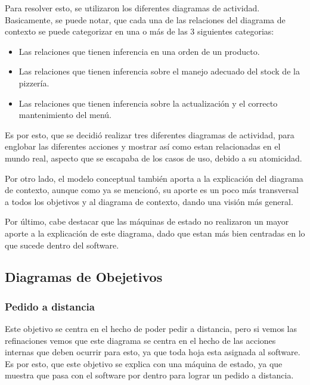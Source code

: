 \documentclass[a4paper,10pt]{article}
\begin{document}
Para resolver esto, se utilizaron los diferentes diagramas de actividad. Basicamente, se puede notar, que cada una de las relaciones del diagrama de
contexto se puede categorizar en una o m\'as de las 3 siguientes categorias:
\begin{itemize}
\item Las relaciones que tienen inferencia en una orden de un producto.
\item Las relaciones que tienen inferencia sobre el manejo adecuado del stock de la pizzer\'ia.
\item Las relaciones que tienen inferencia sobre la actualizaci\'on y el correcto mantenimiento del men\'u.
\end{itemize}

Es por esto, que se decidi\'o realizar tres diferentes diagramas de actividad, para englobar las diferentes acciones y mostrar as\'i como 
estan relacionadas en el mundo real, aspecto que se escapaba de los casos de uso, debido a su atomicidad.



Por otro lado, el modelo conceptual tambi\'en aporta a la explicaci\'on del diagrama de contexto, aunque como ya se mencion\'o, su aporte
es un poco m\'as transversal a todos los objetivos y al diagrama de contexto, dando una visi\'on m\'as general.


Por \'ultimo, cabe destacar que las m\'aquinas de estado no realizaron un mayor aporte a la explicaci\'on de este diagrama, dado que estan m\'as bien
centradas en lo que sucede dentro del software.

\subsection*{Diagramas de Obejetivos}

\subsubsection*{Pedido a distancia}

Este objetivo se centra en el hecho de poder pedir a distancia, pero si vemos las refinaciones vemos que este diagrama se centra en el hecho de las acciones internas que deben ocurrir para esto, ya que toda hoja esta asignada al software. Es por esto, que este objetivo se explica con una m\'aquina de estado, ya que muestra que pasa con el software por dentro para lograr un pedido a distancia.
\end{document}
